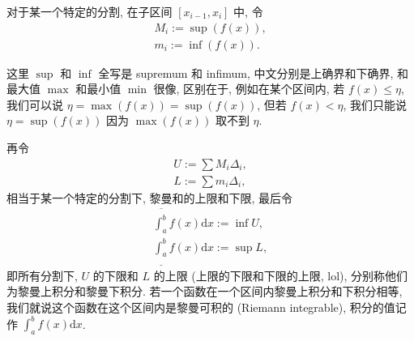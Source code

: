 \begin{tcolorbox}[size=fbox, breakable, enhanced jigsaw, title={更加严格的版本 - 选读}]

对于某一个特定的分割, 在子区间 \([x_{i-1},x_i]\) 中, 令
\begin{gather*}
M_i:=\sup \left(f(x)\right),\\
m_i:=\inf \left(f(x)\right).
\end{gather*}

\begin{newquote}
这里 \(\sup\) 和 \(\inf\) 全写是 supremum 和 infimum,
中文分别是上确界和下确界, 和最大值 \(\max\) 和最小值 \(\min\) 很像,
区别在于, 例如在某个区间内, 若 \(f(x)\le \eta\), 我们可以说
\(\eta=\max \left(f(x)\right)=\sup \left(f(x)\right)\), 但若
\(f(x)<\eta\), 我们只能说 \(\eta=\sup \left(f(x)\right)\) 因为
\(\max \left(f(x)\right)\) 取不到 \(\eta\).
\end{newquote}

再令
\begin{gather*}
U:=\sum M_i\Delta_i,\\
L:=\sum m_i\Delta_i,
\end{gather*}
相当于某一个特定的分割下, 黎曼和的上限和下限, 最后令
\begin{gather*}
\overline{\int_a^b}f(x)\mathrm{d}x:=\inf U,\\
\underline{\int_a^b}f(x)\mathrm{d}x:=\sup L,
\end{gather*}
即所有分割下, \(U\) 的下限和 \(L\) 的上限 (上限的下限和下限的上限,
lol), 分别称他们为黎曼上积分和黎曼下积分.
若一个函数在一个区间内黎曼上积分和下积分相等,
我们就说这个函数在这个区间内是黎曼可积的 (Riemann integrable),
积分的值记作 \(\int_a^bf(x)\mathrm{d}x\).
\end{tcolorbox}